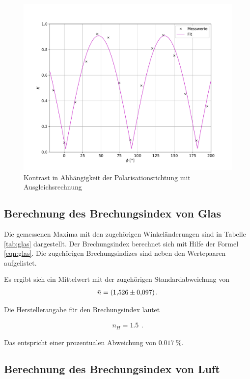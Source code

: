 \begin{figure}[H]
  \centering
  \includegraphics[width=\textwidth]{kontrast.pdf}
  \caption{Kontrast in Abhängigkeit der Polarisationsrichtung mit
  Ausgleichsrechnung}
  \label{fig:kontrast}
\end{figure}
\subsection{Berechnung des Brechungsindex von Glas}
Die gemessenen Maxima mit den zugehörigen Winkeländerungen sind in Tabelle
\ref{tab:glas} dargestellt. Der Brechungsindex berechnet sich mit Hilfe
der Formel \ref{eqn:glas}. Die zugehörigen Brechungsindizes sind neben den
Wertepaaren aufgelistet.



Es ergibt sich ein Mittelwert mit der zugehörigen Standardabweichung von
\begin{align*}
  \bar{n} = \SI{1.526 \pm 0.097}{} \, .\\
\end{align*}

Die Herstellerangabe \cite{skript} für den Brechungsindex lautet

\begin{align*}
  n_H = \SI{1.5}{} \, .
\end{align*}

Das entspricht einer prozentualen Abweichung von $\SI{0.017}{\%}$.

\subsection{Berechnung des Brechungsindex von Luft}

